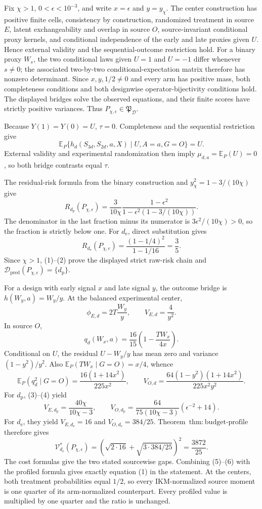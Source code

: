 Fix \(\chi>1\), \(0<\epsilon<10^{-3}\), and write \(x=\epsilon\) and \(y=y_\chi\). The center construction has positive finite cells, consistency by construction, randomized treatment in source \(E\), latent exchangeability and overlap in source \(O\), source-invariant conditional proxy kernels, and conditional independence of the early and late proxies given \(U\). Hence external validity and the sequential-outcome restriction hold. For a binary proxy \(W_s\), the two conditional laws given \(U=1\) and \(U=-1\) differ whenever \(s\ne0\); the associated two-by-two conditional-expectation matrix therefore has nonzero determinant. Since \(x,y,1/2\ne0\) and every arm has positive mass, both completeness conditions and both designwise operator-bijectivity conditions hold. The displayed bridges solve the observed equations, and their finite scores have strictly positive variances. Thus \(P_{\chi,\epsilon}\in\mathfrak P_{\mathcal D}\).

Because \(Y(1)=Y(0)=U\), \(\tau=0\). Completeness and the sequential restriction give
\[
 \mathbb E_P\{h_d(S_{3d},S_{2d},a,X)\mid U,A=a,G=O\}=U.
\]
External validity and experimental randomization then imply \(\mu_{d,a}=\mathbb E_P(U)=0\), so both bridge contrasts equal \(\tau\).

The residual-risk formula from the binary construction and \(y_\chi^2=1-3/(10\chi)\) give
\[
 R_{d_{\mathrm p}}(P_{\chi,\epsilon})
 =\frac{3}{10\chi}\frac{1-\epsilon^2}
 {1-\epsilon^2(1-3/(10\chi))}. \tag{1}
\]
The denominator in the last fraction minus its numerator is \(3\epsilon^2/(10\chi)>0\), so the fraction is strictly below one. For \(d_{\mathrm e}\), direct substitution gives
\[
 R_{d_{\mathrm e}}(P_{\chi,\epsilon})
 =\frac{(1-1/4)^2}{1-1/16}=\frac35. \tag{2}
\]
Since \(\chi>1\), (1)--(2) prove the displayed strict raw-risk chain and \(\mathcal D_{\mathrm{pred}}(P_{\chi,\epsilon})=\{d_{\mathrm p}\}\).

For a design with early signal \(x\) and late signal \(y\), the outcome bridge is \(h(W_y,a)=W_y/y\). At the balanced experimental center,
\[
 \phi_{E,d}=2T\frac{W_y}{y},
 \qquad V_{E,d}=\frac4{y^2}. \tag{3}
\]
In source \(O\),
\[
 q_d(W_x,a)=\frac{16}{15}\left(1-\frac{TW_x}{4x}\right).
\]
Conditional on \(U\), the residual \(U-W_y/y\) has mean zero and variance \((1-y^2)/y^2\). Also \(\mathbb E_P(TW_x\mid G=O)=x/4\), whence
\[
 \mathbb E_P(q_d^2\mid G=O)=\frac{16(1+14x^2)}{225x^2},
 \qquad
 V_{O,d}=\frac{64(1-y^2)(1+14x^2)}{225x^2y^2}. \tag{4}
\]
For \(d_{\mathrm p}\), (3)--(4) yield
\[
 V_{E,d_{\mathrm p}}=\frac{40\chi}{10\chi-3},
 \qquad
 V_{O,d_{\mathrm p}}=\frac{64}{75(10\chi-3)}(\epsilon^{-2}+14). \tag{5}
\]
For \(d_{\mathrm e}\), they yield \(V_{E,d_{\mathrm e}}=16\) and \(V_{O,d_{\mathrm e}}=384/25\). Theorem~\(\mathrm{thm{:}budget\text{-}profile}\) therefore gives
\[
 \mathcal V_{d_{\mathrm e}}^*(P_{\chi,\epsilon})
 =\left(\sqrt{2\cdot16}+\sqrt{3\cdot384/25}\right)^2
 =\frac{3872}{25}. \tag{6}
\]
The cost formulas give the two stated sourcewise gaps. Combining (5)--(6) with the profiled formula gives exactly equation (1) in the statement. At the centers, both treatment probabilities equal \(1/2\), so every IKM-normalized source moment is one quarter of its arm-normalized counterpart. Every profiled value is multiplied by one quarter and the ratio is unchanged.

